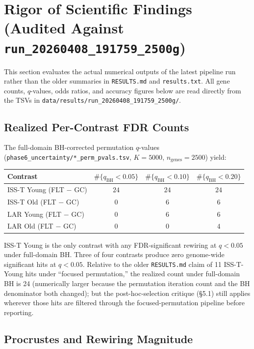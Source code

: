 \documentclass[11pt]{article}
\newcommand{\code}[1]{\texttt{#1}}
\begin{document}
\section{Rigor of Scientific Findings (Audited Against \code{run\_20260408\_191759\_2500g})}

This section evaluates the actual numerical outputs of the latest pipeline run rather than the older summaries in \code{RESULTS.md} and \code{results.txt}. All gene counts, $q$-values, odds ratios, and accuracy figures below are read directly from the TSVs in \code{data/results/run\_20260408\_191759\_2500g/}.

\subsection{Realized Per-Contrast FDR Counts}

The full-domain BH-corrected permutation $q$-values (\code{phase6\_uncertainty/*\_perm\_pvals.tsv}, $K{=}5000$, $n_{\text{genes}}{=}2500$) yield:

\begin{center}
\small
\begin{tabular}{lccc}
\toprule
Contrast & $\#\{q_{\text{BH}} < 0.05\}$ & $\#\{q_{\text{BH}} < 0.10\}$ & $\#\{q_{\text{BH}} < 0.20\}$ \\
\midrule
ISS-T Young (FLT $-$ GC) & $24$ & $24$ & $24$ \\
ISS-T Old   (FLT $-$ GC) & $0$  & $6$  & $6$  \\
LAR Young   (FLT $-$ GC) & $0$  & $6$  & $6$  \\
LAR Old     (FLT $-$ GC) & $0$  & $0$  & $4$  \\
\bottomrule
\end{tabular}
\end{center}

\noindent ISS-T Young is the only contrast with any FDR-significant rewiring at $q{<}0.05$ under full-domain BH. Three of four contrasts produce zero genome-wide significant hits at $q{<}0.05$. Relative to the older \code{RESULTS.md} claim of 11 ISS-T-Young hits under ``focused permutation,'' the realized count under full-domain BH is 24 (numerically larger because the permutation iteration count and the BH denominator both changed); but the post-hoc-selection critique (\S 5.1) still applies wherever those hits are filtered through the focused-permutation pipeline before reporting.

\subsection{Procrustes and Rewiring Magnitude}
\end{document}
